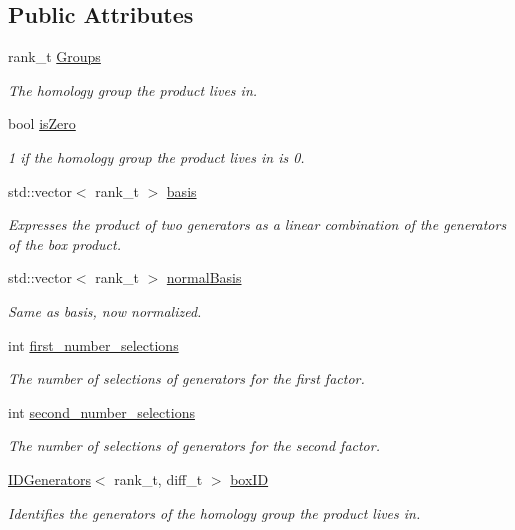 \subsection*{Public Attributes}
\begin{DoxyCompactItemize}
\item 
rank\+\_\+t \hyperlink{classMackey_1_1Green_acfa5ea708949024bd24f1c1e21399cbc}{Groups}
\begin{DoxyCompactList}\small\item\em The homology group the product lives in. \end{DoxyCompactList}\item 
bool \hyperlink{classMackey_1_1Green_a12a01a6d1715538af0bdc6b34fad6b85}{is\+Zero}
\begin{DoxyCompactList}\small\item\em 1 if the homology group the product lives in is 0. \end{DoxyCompactList}\item 
std\+::vector$<$ rank\+\_\+t $>$ \hyperlink{classMackey_1_1Green_a9cfc633ccb548d2d516450399c108174}{basis}
\begin{DoxyCompactList}\small\item\em Expresses the product of two generators as a linear combination of the generators of the box product. \end{DoxyCompactList}\item 
std\+::vector$<$ rank\+\_\+t $>$ \hyperlink{classMackey_1_1Green_a18135b4b1a4aceb387519832a487206a}{normal\+Basis}
\begin{DoxyCompactList}\small\item\em Same as basis, now normalized. \end{DoxyCompactList}\item 
int \hyperlink{classMackey_1_1Green_a18ba76e7f7b71c1e5fca23bc71accf86}{first\+\_\+number\+\_\+selections}
\begin{DoxyCompactList}\small\item\em The number of selections of generators for the first factor. \end{DoxyCompactList}\item 
int \hyperlink{classMackey_1_1Green_a1240acdc0e901e496597eab2d0ef27f2}{second\+\_\+number\+\_\+selections}
\begin{DoxyCompactList}\small\item\em The number of selections of generators for the second factor. \end{DoxyCompactList}\item 
\hyperlink{classMackey_1_1IDGenerators}{I\+D\+Generators}$<$ rank\+\_\+t, diff\+\_\+t $>$ \hyperlink{classMackey_1_1Green_a3ced169c915348d6b0f3f178c6b2d7ff}{box\+ID}
\begin{DoxyCompactList}\small\item\em Identifies the generators of the homology group the product lives in. \end{DoxyCompactList}\end{DoxyCompactItemize}


